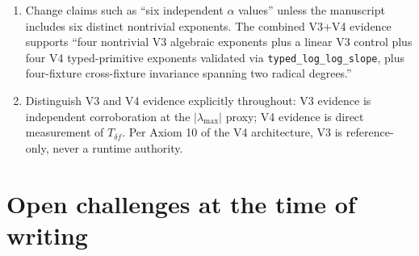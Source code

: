 \documentclass[11pt,a4paper]{article}
\begin{document}
\begin{enumerate}
    \item Change claims such as ``six independent $\alpha$ values'' unless the manuscript includes six distinct nontrivial exponents. The combined V3+V4 evidence supports ``four nontrivial V3 algebraic exponents plus a linear V3 control plus four V4 typed-primitive exponents validated via \texttt{typed\_log\_log\_slope}, plus four-fixture cross-fixture invariance spanning two radical degrees.''
    \item Distinguish V3 and V4 evidence explicitly throughout: V3 evidence is independent corroboration at the $|\lambda_{\max}|$ proxy; V4 evidence is direct measurement of $T_{\delta f}$. Per Axiom 10 of the V4 architecture, V3 is reference-only, never a runtime authority.
\end{enumerate}

\section{Open challenges at the time of writing}
\end{document}
